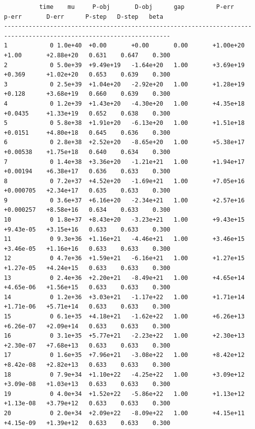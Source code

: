 \documentclass[12pt]{article}
\numberwithin{equation}{section}
\begin{document}
\begin{lstlisting}
          time    mu     P-obj       D-obj      gap         P-err       p-err       D-err      P-step   D-step   beta
---------------------------------------------------------------------------------------------------------------------
1            0 1.0e+40  +0.00       +0.00       0.00       +1.00e+20   +1.00       +2.88e+20   0.631    0.647    0.300
2            0 5.0e+39  +9.49e+19   -1.64e+20   1.00       +3.69e+19   +0.369      +1.02e+20   0.653    0.639    0.300
3            0 2.5e+39  +1.04e+20   -2.92e+20   1.00       +1.28e+19   +0.128      +3.68e+19   0.660    0.639    0.300
4            0 1.2e+39  +1.43e+20   -4.30e+20   1.00       +4.35e+18   +0.0435     +1.33e+19   0.652    0.638    0.300
5            0 5.8e+38  +1.91e+20   -6.13e+20   1.00       +1.51e+18   +0.0151     +4.80e+18   0.645    0.636    0.300
6            0 2.8e+38  +2.52e+20   -8.65e+20   1.00       +5.38e+17   +0.00538    +1.75e+18   0.640    0.634    0.300
7            0 1.4e+38  +3.36e+20   -1.21e+21   1.00       +1.94e+17   +0.00194    +6.38e+17   0.636    0.633    0.300
8            0 7.2e+37  +4.52e+20   -1.69e+21   1.00       +7.05e+16   +0.000705   +2.34e+17   0.635    0.633    0.300
9            0 3.6e+37  +6.16e+20   -2.34e+21   1.00       +2.57e+16   +0.000257   +8.58e+16   0.634    0.633    0.300
10           0 1.8e+37  +8.43e+20   -3.23e+21   1.00       +9.43e+15   +9.43e-05   +3.15e+16   0.633    0.633    0.300
11           0 9.3e+36  +1.16e+21   -4.46e+21   1.00       +3.46e+15   +3.46e-05   +1.16e+16   0.633    0.633    0.300
12           0 4.7e+36  +1.59e+21   -6.16e+21   1.00       +1.27e+15   +1.27e-05   +4.24e+15   0.633    0.633    0.300
13           0 2.4e+36  +2.20e+21   -8.49e+21   1.00       +4.65e+14   +4.65e-06   +1.56e+15   0.633    0.633    0.300
14           0 1.2e+36  +3.03e+21   -1.17e+22   1.00       +1.71e+14   +1.71e-06   +5.71e+14   0.633    0.633    0.300
15           0 6.1e+35  +4.18e+21   -1.62e+22   1.00       +6.26e+13   +6.26e-07   +2.09e+14   0.633    0.633    0.300
16           0 3.1e+35  +5.77e+21   -2.23e+22   1.00       +2.30e+13   +2.30e-07   +7.68e+13   0.633    0.633    0.300
17           0 1.6e+35  +7.96e+21   -3.08e+22   1.00       +8.42e+12   +8.42e-08   +2.82e+13   0.633    0.633    0.300
18           0 7.9e+34  +1.10e+22   -4.25e+22   1.00       +3.09e+12   +3.09e-08   +1.03e+13   0.633    0.633    0.300
19           0 4.0e+34  +1.52e+22   -5.86e+22   1.00       +1.13e+12   +1.13e-08   +3.79e+12   0.633    0.633    0.300
20           0 2.0e+34  +2.09e+22   -8.09e+22   1.00       +4.15e+11   +4.15e-09   +1.39e+12   0.633    0.633    0.300

\end{lstlisting}
\end{document}
